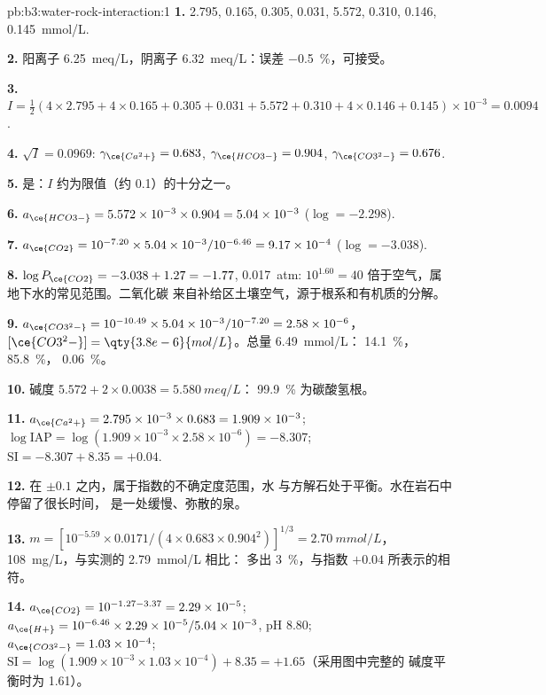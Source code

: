 \begin{solution}{pb:b3:water-rock-interaction:1}
\textbf{1.}  2.795,  0.165,  0.305,  0.031,
 5.572,  0.310,  0.146,  \qty{0.145}{mmol/L}.

\textbf{2.} 阳离子 \qty{6.25}{meq/L}，阴离子 \qty{6.32}{meq/L}：误差
\qty{-0.5}{\percent}，可接受。

\textbf{3.} $I = \tfrac12(4\times2.795 + 4\times0.165 + 0.305 + 0.031 + 5.572
+ 0.310 + 4\times0.146 + 0.145)\times10^{-3} = 0.0094$.

\textbf{4.} $\sqrt I = 0.0969$: $\gamma_{\ce{Ca^2+}} = 0.683$,
$\gamma_{\ce{HCO3-}} = 0.904$, $\gamma_{\ce{CO3^2-}} = 0.676$.

\textbf{5.} 是：$I$ 约为限值（约 0.1）的十分之一。

\textbf{6.} $a_{\ce{HCO3-}} = 5.572\times10^{-3}\times0.904 = 5.04\times
10^{-3}$ ($\log = -2.298$).

\textbf{7.} $a_{\ce{CO2}} = 10^{-7.20}\times5.04\times10^{-3}/10^{-6.46} =
9.17\times10^{-4}$ ($\log = -3.038$).

\textbf{8.} $\log P_{\ce{CO2}} = -3.038 + 1.27 = -1.77$, \qty{0.017}{atm}:
$10^{1.60} = 40$ 倍于空气，属地下水的常见范围。二氧化碳
来自补给区土壤空气，源于根系和有机质的分解。

\textbf{9.} $a_{\ce{CO3^2-}} = 10^{-10.49}\times5.04\times10^{-3}/10^{-7.20}
= 2.58\times10^{-6}$，$[\ce{CO3^2-}] = \qty{3.8e-6}{mol/L}$。总量
\qty{6.49}{mmol/L}： \qty{14.1}{\percent}，
\qty{85.8}{\percent}， \qty{0.06}{\percent}。

\textbf{10.} 碱度 $5.572 + 2\times0.0038 = \qty{5.580}{meq/L}$：
\qty{99.9}{\percent} 为碳酸氢根。

\textbf{11.} $a_{\ce{Ca^2+}} = 2.795\times10^{-3}\times0.683 = 1.909\times
10^{-3}$; $\log\mathrm{IAP} = \log(1.909\times10^{-3}\times2.58\times10^{-6})
= -8.307$; $\mathrm{SI} = -8.307 + 8.35 = +0.04$.

\textbf{12.} 在 $\pm0.1$ 之内，属于指数的不确定度范围，水
与方解石处于平衡。水在岩石中停留了很长时间，
是一处缓慢、弥散的泉。

\textbf{13.} $m = [10^{-5.59}\times0.0171/(4\times0.683\times0.904^2)]^{1/3}
= \qty{2.70}{mmol/L}$，\qty{108}{mg/L}，与实测的 \qty{2.79}{mmol/L} 相比：
多出 \qty{3}{\percent}，与指数 $+0.04$ 所表示的相符。

\textbf{14.} $a_{\ce{CO2}} = 10^{-1.27 - 3.37} = 2.29\times10^{-5}$;
$a_{\ce{H+}} = 10^{-6.46}\times2.29\times10^{-5}/5.04\times10^{-3}$, pH 8.80;
$a_{\ce{CO3^2-}} = 1.03\times10^{-4}$; $\mathrm{SI} = \log(1.909\times
10^{-3}\times1.03\times10^{-4}) + 8.35 = +1.65$（采用图中完整的
碱度平衡时为 1.61）。


\end{solution}

